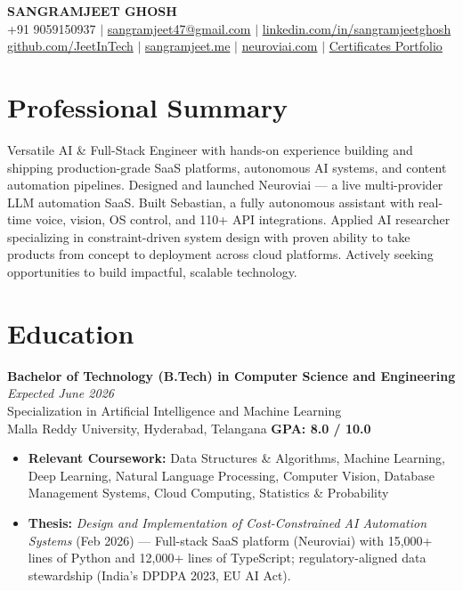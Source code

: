 \documentclass[11pt]{article}
\begin{document}
\begin{center}
{\LARGE \textbf{SANGRAMJEET GHOSH}} \\[6pt]
{\normalsize
  +91 9059150937 \quad $|$ \quad
  \href{mailto:sangramjeet47@gmail.com}{sangramjeet47@gmail.com} \quad $|$ \quad
  \href{https://www.linkedin.com/in/sangramjeetghosh}{linkedin.com/in/sangramjeetghosh}
}\\[2pt]
{\normalsize
  \href{https://github.com/JeetInTech}{github.com/JeetInTech} \quad $|$ \quad
  \href{https://sangramjeet.me}{sangramjeet.me} \quad $|$ \quad
  \href{https://neuroviai.com}{neuroviai.com} \quad $|$ \quad
  \href{https://drive.google.com/drive/folders/1ZQd-DeX-rXlEVDTwDJfjLjnG7iPc_fEw}{Certificates Portfolio}
}
\end{center}

\vspace{2pt}

\section*{Professional Summary}

Versatile AI \& Full-Stack Engineer with hands-on experience building and shipping production-grade SaaS platforms, autonomous AI systems, and content automation pipelines. Designed and launched Neuroviai — a live multi-provider LLM automation SaaS. Built Sebastian, a fully autonomous assistant with real-time voice, vision, OS control, and 110+ API integrations. Applied AI researcher specializing in constraint-driven system design with proven ability to take products from concept to deployment across cloud platforms. Actively seeking opportunities to build impactful, scalable technology.

\section*{Education}

\textbf{Bachelor of Technology (B.Tech) in Computer Science and Engineering} \hfill \textit{Expected June 2026} \\
Specialization in Artificial Intelligence and Machine Learning \\
Malla Reddy University, Hyderabad, Telangana \hfill \textbf{GPA: 8.0 / 10.0}

\begin{itemize}
\item \textbf{Relevant Coursework:} Data Structures \& Algorithms, Machine Learning, Deep Learning, Natural Language Processing, Computer Vision, Database Management Systems, Cloud Computing, Statistics \& Probability
\item \textbf{Thesis:} \textit{Design and Implementation of Cost-Constrained AI Automation Systems} (Feb 2026) --- Full-stack SaaS platform (Neuroviai) with 15,000+ lines of Python and 12,000+ lines of TypeScript; regulatory-aligned data stewardship (India's DPDPA 2023, EU AI Act).
\end{itemize}
\end{document}
